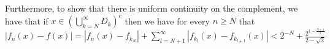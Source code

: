 \documentclass[12pt, letterpaper]{article}
\newcommand{\N}{\mathbb{N}}
\begin{document}
\begin{enumerate}
	Furthermore, to show that there is uniform continuity on the complement, we have that if $x \in(\bigcup_{k=N}^\infty D_k)^c$ then we have for every $n \geq N$ that $|f_n(x) - f(x)| = |f_n(x) - f_{k_N}| + \sum_{l = N+1}^\infty |f_{k_l}(x) - f_{k_{l+1}}(x)|< 2^{-N} + \frac{2^{1 - \frac{N+1}{2}}}{2 - \sqrt{2}} $

\end{enumerate}
\end{document}
